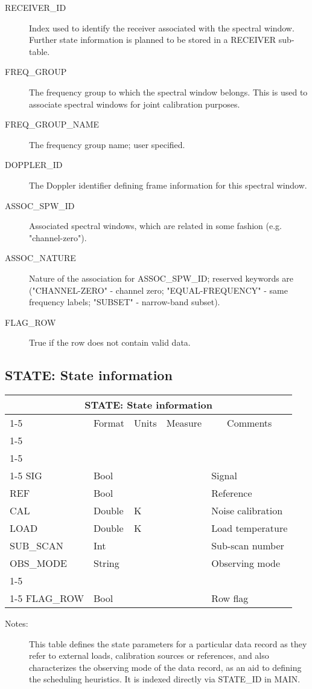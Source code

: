 \documentclass{article}
\newcommand{\defline}[1]{\cline{1-5}
\multicolumn{5}{|l|}{#1} \\
\cline{1-5}}
\newcommand{\definetable}[2]
{
	\vfill\newpage
	\subsection{#1}
        \vspace{0.15in}
        \small
	\begin{tabular}{|l|p{1.25in}|l|p{.9in}|p{1.4in}|}
	\hline
	\multicolumn{5}{|c|}{\bf #1}\\ 
	\cline{1-5}
        \multicolumn{1}{|c|}{Name}&\multicolumn{1}{|c|}{Format}&
        \multicolumn{1}{|c|}{Units}&\multicolumn{1}{|c|}{Measure}&
        \multicolumn{1}{|c|}{Comments}\\
        \cline{1-5}
        #2
        \hline
	\end{tabular}
}
\begin{document}
\begin{itemize}
\begin{description}
\item[RECEIVER\_ID] Index used to identify the receiver associated
with the spectral window. Further state information is planned to be
stored in a RECEIVER sub-table.

\item[FREQ\_GROUP] The frequency group to which the spectral window belongs.
This is used to associate spectral windows for joint calibration purposes.

\item[FREQ\_GROUP\_NAME] The frequency group name; user specified.

\item[DOPPLER\_ID] The Doppler identifier defining frame information
for this spectral window.

\item[ASSOC\_SPW\_ID] Associated spectral windows, which are related
in some fashion (e.g. "channel-zero").

\item[ASSOC\_NATURE] Nature of the association for ASSOC\_SPW\_ID;
reserved keywords are ("CHANNEL-ZERO" - channel zero;
"EQUAL-FREQUENCY" - same frequency labels; "SUBSET" - narrow-band
subset).

\item[FLAG\_ROW] True if the row does not contain valid data.

\end{description}

\definetable{STATE: State information}{
\defline{\bf Columns}
\defline{\em Data}  
SIG   &     Bool  &           &        & Signal \\
REF   &     Bool  &           &        & Reference \\
CAL   &     Double &   K      &        & Noise calibration \\
LOAD  &     Double &   K      &        & Load temperature\\
SUB\_SCAN &  Int   &          &        & Sub-scan number\\
OBS\_MODE &  String &         &        & Observing mode\\
\defline{\em Flags}
FLAG\_ROW & Bool &            &        & Row flag\\
}
\begin{description}

\item[Notes:] This table defines the state parameters for a particular
data record as they refer to external loads, calibration sources or
references, and also characterizes the observing mode of the data
record, as an aid to defining the scheduling heuristics. It is indexed
directly via STATE\_ID in MAIN.


\end{description}
\end{itemize}
\end{document}
